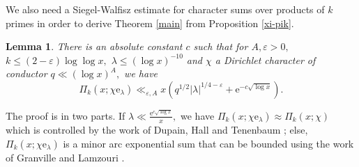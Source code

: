 \documentclass{article}
\newtheorem{lemma}[prop]{Lemma}
\newcommand{\e}{\mathrm{e}}
\newcommand{\eps}{\varepsilon}
\begin{document}
We also need a Siegel-Walfisz estimate for character sums over products of $k$ primes in order to derive Theorem \ref{main} from Proposition \ref{xi-pik}. 
\begin{lemma}\label{sw-pik}
    There is an absolute constant $c$ such that for $A, \eps > 0,$ $k \le (2-\eps)\log\log x, $ $\lambda \le (\log x)^{-10}$ and $\chi$ a Dirichlet character of conductor $q \ll (\log x)^A,$ we have $$\Pi_k(x; \chi\e_\lambda) \ll_{\eps, A} x\left(q^{1/2}|\lambda|^{1/4-\eps} + \e^{-c\sqrt{\log x}}\right).$$ 
\end{lemma}
The proof is in two parts. If $\lambda \ll \frac{\e^{c\sqrt{\log x}}}{x},$ we have $\Pi_k(x;\chi\e_\lambda) \approx \Pi_k(x;\chi)$ which is controlled by the work of Dupain, Hall and Tenenbaum \cite{dht}; else, $\Pi_k(x;\chi\e_\lambda)$ is a minor arc exponential sum that can be bounded using the work of Granville and Lamzouri \cite{exponential}.
\end{document}
